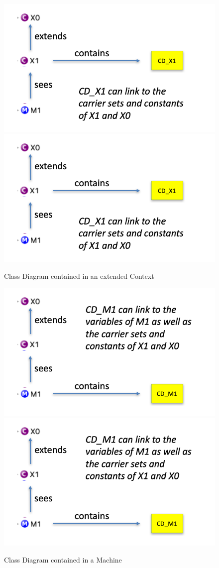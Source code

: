\documentclass[a4paper,10pt]{article}
\begin{document}
	
	\begin{figure}[!htbp]
		\centering
		\ifplastex
		\includegraphics[width=500]{figures/containment_2.png}
		\else
		\includegraphics[width=.5\textwidth]{figures/containment_2.png}
		\fi
		\caption{Class Diagram contained in an extended Context}
		\label{fig:CDContainment2}
	\end{figure}
	
	
	\begin{figure}[!htbp]
		\centering
		\ifplastex
		\includegraphics[width=500]{figures/containment_3.png}
		\else
		\includegraphics[width=.5\textwidth]{figures/containment_3.png}
		\fi
		\caption{Class Diagram contained in a Machine}
		\label{fig:CDContainment3}
	\end{figure}
\end{document}

